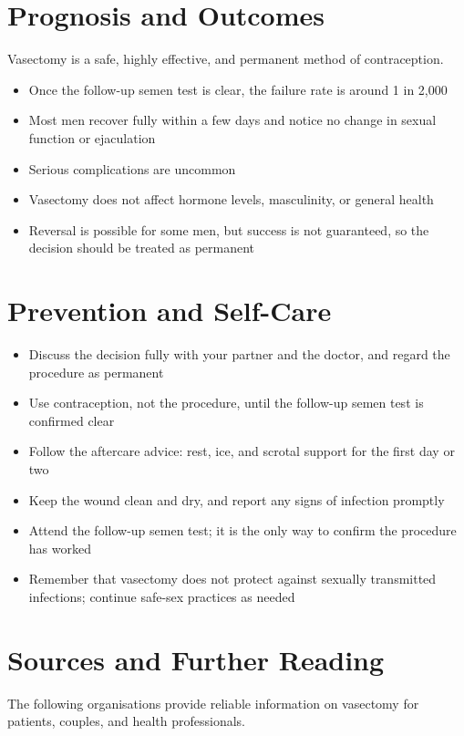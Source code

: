 \section*{Prognosis and Outcomes}
Vasectomy is a safe, highly effective, and permanent method of contraception.

\begin{itemize}
    \item Once the follow-up semen test is clear, the failure rate is around 1 in 2,000
    \item Most men recover fully within a few days and notice no change in sexual function or ejaculation
    \item Serious complications are uncommon
    \item Vasectomy does not affect hormone levels, masculinity, or general health
    \item Reversal is possible for some men, but success is not guaranteed, so the decision should be treated as permanent
\end{itemize}

\section*{Prevention and Self-Care}
\begin{itemize}
    \item Discuss the decision fully with your partner and the doctor, and regard the procedure as permanent
    \item Use contraception, not the procedure, until the follow-up semen test is confirmed clear
    \item Follow the aftercare advice: rest, ice, and scrotal support for the first day or two
    \item Keep the wound clean and dry, and report any signs of infection promptly
    \item Attend the follow-up semen test; it is the only way to confirm the procedure has worked
    \item Remember that vasectomy does not protect against sexually transmitted infections; continue safe-sex practices as needed
\end{itemize}

\section*{Sources and Further Reading}
The following organisations provide reliable information on vasectomy for patients, couples, and health professionals.

